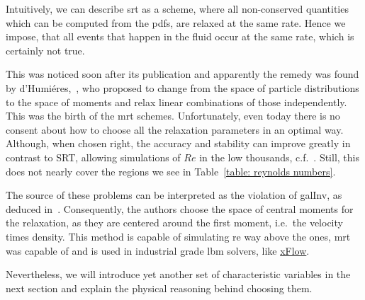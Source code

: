 Intuitively, we can describe \gls{srt} as a scheme, where all non-conserved quantities which can be computed from the \glspl{pdf}, are relaxed at the same rate.
Hence we impose, that all events that happen in the fluid occur at the same rate, which is certainly not true.

This was noticed soon after its publication and apparently the remedy was found by d'Humiéres,~\cite{d1994generalized}, who proposed to change from the space of particle distributions to the space of moments and relax linear combinations of those independently.
This was the birth of the \gls{mrt} schemes.
Unfortunately, even today there is no consent about how to choose all the relaxation parameters in an optimal way.
Although, when chosen right, the accuracy and stability can improve greatly in contrast to SRT, allowing simulations of $Re$ in the low thousands, c.f.~\cite{d2002multiple}. Still, this does not nearly cover the regions we see in Table~\ref{table: reynolds numbers}.

The source of these problems can be interpreted as the violation of \gls{galInv}, as deduced in~\cite{geier2006cascaded}. Consequently, the authors choose the space of central moments for the relaxation, as they are centered around the first moment, i.e.\ the velocity times density.
This method is capable of simulating \gls{re} way above the ones, \gls{mrt} was capable of and is used in industrial grade \gls{lbm} solvers, like \href{http://www.xflowcfd.com/technology/view/cfd}{xFlow}.

Nevertheless, we will introduce yet another set of characteristic variables in the next section and explain the physical reasoning behind choosing them.
